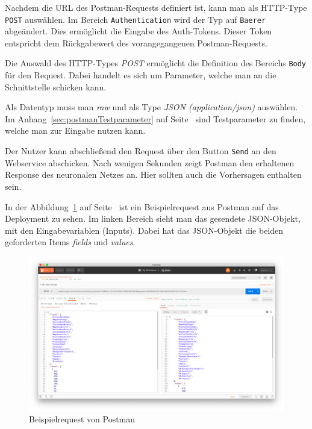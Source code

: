 Nachdem die URL des Postman-Requests definiert ist, kann man als HTTP-Type \texttt{POST} auswählen. Im Bereich
\texttt{Authentication} wird der Typ auf \texttt{Baerer} abgeändert. Dies ermöglicht die Eingabe des Auth-Tokens. Dieser
Token entspricht dem Rückgabewert des vorangegangenen Postman-Requests.

Die Auswahl des HTTP-Types \textit{POST} ermöglicht die Definition des Bereichs \texttt{Body} für den Request. Dabei
handelt es sich um Parameter, welche man an die Schnittstelle schicken kann.

Als Datentyp muss man \textit{raw} und als Type \textit{JSON (application/json)} auswählen. Im
Anhang~\ref{sec:postmanTestparameter} auf Seite~\pageref{sec:postmanTestparameter} sind Testparameter zu finden, welche
man zur Eingabe nutzen kann.

Der Nutzer kann abschließend den Request über den Button \texttt{Send} an den Webservice abschicken. Nach wenigen
Sekunden zeigt Postman den erhaltenen Response des neuronalen Netzes an. Hier sollten auch die Vorhersagen enthalten
sein.

In der Abbildung~\ref{fig:umsetzung_deployment_postman} auf Seite~\pageref{fig:umsetzung_deployment_postman} ist ein
Beispielrequest aus Postman auf das Deployment zu sehen. Im linken Bereich sieht man das gesendete JSON-Objekt, mit den
Eingabevariablen (Inputs). Dabei hat das JSON-Objekt die beiden geforderten Items \textit{fields} und \textit{values}.

\begin{figure}[h]
    \centering
    \includegraphics[width=\textwidth]{images/kapitel_3/deployment_postman.png}
    \caption{Beispielrequest von Postman}
    \label{fig:umsetzung_deployment_postman}
\end{figure}


